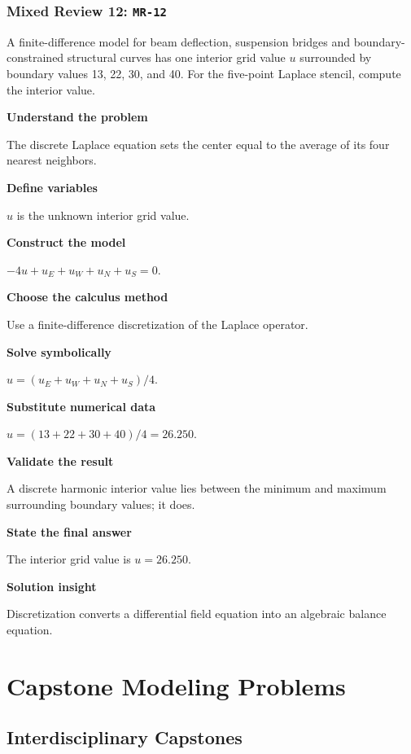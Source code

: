 \documentclass[11pt]{book}
\newcommand{\pid}[1]{\texttt{#1}}
\begin{document}
\section*{Mixed Review 12: \pid{MR-12}}
\begin{problembox}A finite-difference model for beam deflection, suspension bridges and boundary-constrained structural curves has one interior grid value $u$ surrounded by boundary values 13, 22, 30, and 40. For the five-point Laplace stencil, compute the interior value.\end{problembox}
\begin{solutionbox}
\textbf{Understand the problem}\par The discrete Laplace equation sets the center equal to the average of its four nearest neighbors.\par\medskip
\textbf{Define variables}\par $u$ is the unknown interior grid value.\par\medskip
\textbf{Construct the model}\par $-4u+u_E+u_W+u_N+u_S=0$.\par\medskip
\textbf{Choose the calculus method}\par Use a finite-difference discretization of the Laplace operator.\par\medskip
\textbf{Solve symbolically}\par $u=(u_E+u_W+u_N+u_S)/4$.\par\medskip
\textbf{Substitute numerical data}\par $u=(13+22+30+40)/4=26.250$.\par\medskip
\textbf{Validate the result}\par A discrete harmonic interior value lies between the minimum and maximum surrounding boundary values; it does.\par\medskip
\textbf{State the final answer}\par The interior grid value is $u=26.250$.\par\medskip
\textbf{Solution insight}\par Discretization converts a differential field equation into an algebraic balance equation.\par\medskip
\end{solutionbox}
\part{Capstone Modeling Problems}
\chapter{Interdisciplinary Capstones}
\end{document}
